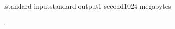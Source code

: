 \begin{problem}{.}{standard input}{standard output}{1 second}{1024 megabytes}

.

\Example

\begin{example}
%
\end{example}

\end{problem}

